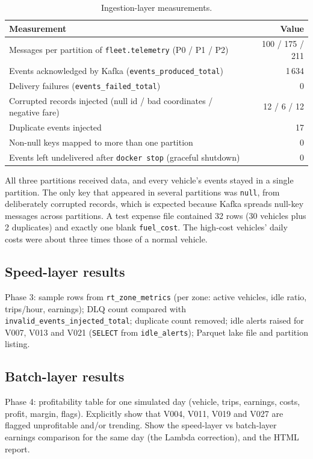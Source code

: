 \documentclass[11pt,a4paper]{article}
\newcommand{\code}[1]{\texttt{\small #1}}
\newcommand{\tocomplete}[1]{%
  \begin{tcolorbox}[colback=orange!6,colframe=orange!70!black,
    title=To complete (evidence from the running system),fonttitle=\bfseries\small,
    boxrule=0.6pt,arc=1mm]\small #1\end{tcolorbox}}
\begin{document}
\begin{table}[H]
\centering\small
\begin{tabular}{l r}
\toprule
\textbf{Measurement} & \textbf{Value} \\
\midrule
Messages per partition of \code{fleet.telemetry} (P0 / P1 / P2) & 100 / 175 / 211 \\
Events acknowledged by Kafka (\code{events\_produced\_total}) & 1\,634 \\
Delivery failures (\code{events\_failed\_total}) & 0 \\
Corrupted records injected (null id / bad coordinates / negative fare) & 12 / 6 / 12 \\
Duplicate events injected & 17 \\
Non-null keys mapped to more than one partition & 0 \\
Events left undelivered after \code{docker stop} (graceful shutdown) & 0 \\
\bottomrule
\end{tabular}
\caption{Ingestion-layer measurements.}
\label{tab:ingest}
\end{table}

All three partitions received data, and every vehicle's events stayed in a single partition.
The only key that appeared in several partitions was \code{null}, from deliberately corrupted
records, which is expected because Kafka spreads null-key messages across partitions. A test
expense file contained 32 rows (30 vehicles plus 2 duplicates) and exactly one blank
\code{fuel\_cost}. The high-cost vehicles' daily costs were about three times those of a normal
vehicle.

\subsection{Speed-layer results}
\tocomplete{Phase 3: sample rows from \code{rt\_zone\_metrics} (per zone: active vehicles, idle
ratio, trips/hour, earnings); DLQ count compared with \code{invalid\_events\_injected\_total};
duplicate count removed; idle alerts raised for V007, V013 and V021 (\code{SELECT} from
\code{idle\_alerts}); Parquet lake file and partition listing.}

\subsection{Batch-layer results}
\tocomplete{Phase 4: profitability table for one simulated day (vehicle, trips, earnings, costs,
profit, margin, flags). Explicitly show that V004, V011, V019 and V027 are flagged unprofitable
and/or trending. Show the speed-layer vs batch-layer earnings comparison for the same day (the
Lambda correction), and the HTML report.}
\end{document}
